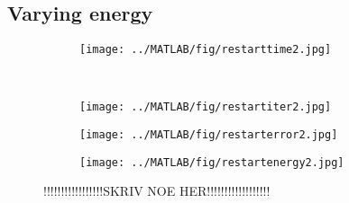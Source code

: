 \subsection{Varying energy}%
\begin{figure}[H]
        \centering
        \begin{subfigure}[b]{0.45\textwidth}
                \texttt{[image: ../MATLAB/fig/restarttime2.jpg]}
                \caption{  }
                \label{fig:restarttime2}
        \end{subfigure}
        ~
        \begin{subfigure}[b]{0.45\textwidth}
                \texttt{[image: ../MATLAB/fig/restartiter2.jpg]}
                \caption{  }
                \label{fig:restartiter2}
        \end{subfigure}
        \begin{subfigure}[b]{0.45\textwidth}
                \texttt{[image: ../MATLAB/fig/restarterror2.jpg]}
                \caption{  }
                \label{fig:restarterror2}
        \end{subfigure}
        \begin{subfigure}[b]{0.45\textwidth}
                \texttt{[image: ../MATLAB/fig/restartenergy2.jpg]}
                \caption{  }
                \label{fig:restartenergy2}
        \end{subfigure}
        \caption{ !!!!!!!!!!!!!!!!!SKRIV NOE HER!!!!!!!!!!!!!!!!!!  }
        \label{fig:restart2}
\end{figure}


